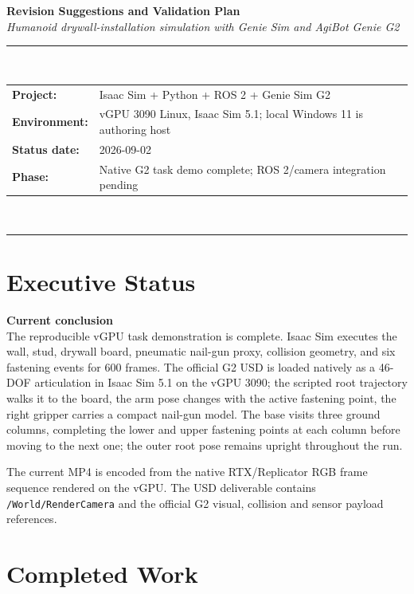 \documentclass[11pt,a4paper]{article}
\newenvironment{statusbox}[1]{%
  \begin{mdframed}[backgroundcolor=lightgray,linecolor=borderblue,linewidth=1.2pt,
                   innertopmargin=6pt,innerbottommargin=6pt,
                   innerleftmargin=10pt,innerrightmargin=10pt]
  \textbf{\color{sectionblue}#1}\\[4pt]
}{%
  \end{mdframed}
}
\begin{document}
\begin{center}
  {\LARGE\bfseries Revision Suggestions and Validation Plan}\\[6pt]
  {\large\itshape Humanoid drywall-installation simulation with Genie Sim and AgiBot Genie G2}\\[10pt]
  \rule{\linewidth}{1pt}\\[4pt]
  \begin{tabular}{ll}
    \textbf{Project:} & Isaac Sim + Python + ROS 2 + Genie Sim G2 \\
    \textbf{Environment:} & vGPU 3090 Linux, Isaac Sim 5.1; local Windows 11 is authoring host \\
    \textbf{Status date:} & 2026-09-02 \\
    \textbf{Phase:} & Native G2 task demo complete; ROS 2/camera integration pending \\
  \end{tabular}\\[4pt]
  \rule{\linewidth}{1pt}
\end{center}

\section{Executive Status}

\begin{statusbox}{Current conclusion}
The reproducible vGPU task demonstration is complete. Isaac Sim executes the wall,
stud, drywall board, pneumatic nail-gun proxy, collision geometry, and six fastening
events for 600 frames. The official G2 USD is loaded natively as a 46-DOF articulation
in Isaac Sim 5.1 on the vGPU 3090; the scripted root trajectory walks it to the board,
the arm pose changes with the active fastening point, the right gripper carries a
compact nail-gun model. The base visits three ground columns, completing the lower
and upper fastening points at each column before moving to the next one; the outer
root pose remains upright throughout the run.
\end{statusbox}

The current MP4 is encoded from the native RTX/Replicator RGB frame sequence rendered
on the vGPU. The USD deliverable contains \texttt{/World/RenderCamera} and the official
G2 visual, collision and sensor payload references.

\section{Completed Work}
\end{document}
